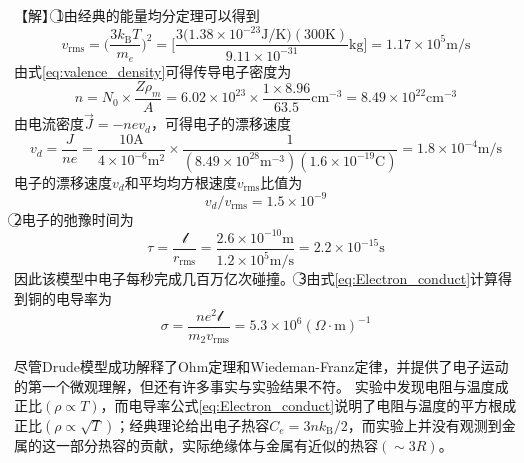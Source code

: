 【解】\textcircled{1}由经典的能量均分定理可以得到
\begin{displaymath}
	v_{\mathrm{rms}}=\bigg(\dfrac{3k_{\mathrm{B}}T}{m_e}\bigg)^2=\bigg[\dfrac{3\big(1.38\times10^{-23}\mathrm{J/K}\big)(300\mathrm{K})}{9.11\times10^{-31}}\mathrm{kg}\bigg]=1.17\times10^5\mathrm{m/s}
\end{displaymath} 
由式\eqref{eq:valence_density}可得传导电子密度为
\begin{displaymath}
	n=N_0\times\dfrac{Z\rho_m}{A}=6.02\times10^{23}\times\dfrac{1\times8.96}{63.5}\mathrm{cm}^{-3}=8.49\times10^{22}\mathrm{cm}^{-3}
\end{displaymath} 
由电流密度$\vec J=-nev_d$，可得电子的漂移速度
\begin{displaymath}
	v_d=\dfrac{J}{ne}=\dfrac{10\mathrm{A}}{4\times10^{-6}\mathrm{m}^2}\times\dfrac1{(8.49\times10^{28}\mathrm{m}^{-3})(1.6\times10^{-19}\mathrm{C})}=1.8\times10^{-4}\mathrm{m/s}
\end{displaymath} 
电子的漂移速度$v_d$和平均均方根速度$v_{\mathrm{rms}}$比值为
\begin{displaymath}
	v_d/v_{\mathrm{rms}}=1.5\times10^{-9}
\end{displaymath}
\textcircled{2}电子的弛豫时间为
\begin{displaymath}
	\tau=\dfrac{\mathscr{l}}{r_{\mathrm{rms}}}=\dfrac{2.6\times10^{-10}\mathrm{m}}{1.2\times10^5\mathrm{m/s}}=2.2\times10^{-15}\mathrm{s}
\end{displaymath}
因此该模型中电子每秒完成几百万亿次碰撞。
\textcircled{3}由式\eqref{eq:Electron_conduct}计算得到铜的电导率为
\begin{displaymath}
	\sigma=\dfrac{ne^2\mathscr{l}}{m_2v_{\mathrm{rms}}}=5.3\times10^6(\Omega\cdot\mathrm{m})^{-1}
\end{displaymath} 

尽管Drude模型成功解释了Ohm定理和Wiedeman-Franz定律，并提供了电子运动的第一个微观理解，但还有许多事实与实验结果不符。%
实验中发现电阻与温度成正比$(\rho\propto T)$，而电导率公式\eqref{eq:Electron_conduct}说明了电阻与温度的平方根成正比$(\rho\propto\sqrt{T})$；经典理论给出电子热容$C_e=3nk_{\mathrm{B}}/2$，而实验上并没有观测到金属的这一部分热容的贡献，实际绝缘体与金属有近似的热容$(\sim3R)$。
